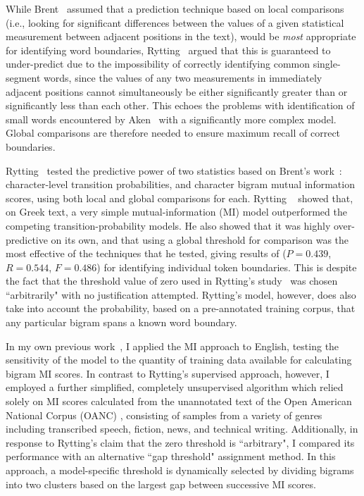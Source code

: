 While Brent~\cite{brent99} assumed that a prediction technique based on local comparisons (i.e., looking for significant differences between the values of a given statistical measurement between adjacent positions in the text), would be \textit{most} appropriate for identifying word boundaries, Rytting~\cite{rytting04} argued that this is guaranteed to under-predict due to the impossibility of correctly identifying common single-segment words, since the values of any two measurements in immediately adjacent positions cannot simultaneously be either significantly greater than or significantly less than each other. This echoes the problems with identification of small words encountered by Aken~\cite{aken11} with a significantly more complex model. Global comparisons are therefore needed to ensure maximum recall of correct boundaries.

Rytting~\cite{rytting04} tested the predictive power of two statistics based on Brent's work~\cite{brent99}: character-level transition probabilities, and character bigram mutual information scores, using both local and global comparisons for each. Rytting ~\cite{rytting04} showed that, on Greek text, a very simple mutual-information (MI) model outperformed the competing transition-probability models. He also showed that it was highly over-predictive on its own, and that using a global threshold for comparison was the most effective of the techniques that he tested, giving results of ($P = 0.439$, $R = 0.544$, $F = 0.486$) for identifying individual token boundaries. This is despite the fact that the threshold value of zero used in Rytting's study~\cite{rytting04} was chosen ``arbitrarily" with no justification attempted. Rytting's model, however, does also take into account the probability, based on a pre-annotated training corpus, that any particular bigram spans a known word boundary.

In my own previous work~\cite{kearsley14}, I applied the MI approach to English, testing the sensitivity of the model to the quantity of training data available for calculating bigram MI scores. In contrast to Rytting's supervised approach, however, I employed a further simplified, completely unsupervised algorithm which relied solely on MI scores calculated from the unannotated text of the Open American National Corpus (OANC) \cite{oanc}, consisting of samples from a variety of genres including transcribed speech, fiction, news, and technical writing. Additionally, in response to Rytting's claim that the zero threshold is ``arbitrary", I compared its performance with an alternative ``gap threshold" assignment method. In this approach, a model-specific threshold is dynamically selected by dividing bigrams into two clusters based on the largest gap between successive MI scores.

